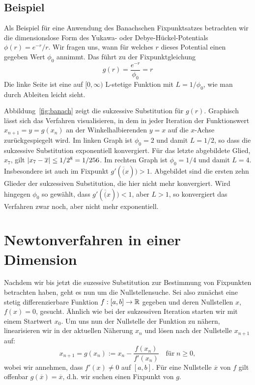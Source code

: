 \subsection{Beispiel}

Als Beispiel für eine Anwendung des Banachschen Fixpunktsatzes
betrachten wir die dimensionslose Form des Yukawa- oder
Debye-Hückel-Potentials $\phi(r) = e^{-r}/r$. Wir fragen uns, wann für
welches $r$ dieses Potential einen gegeben Wert $\phi_0$ annimmt. Das
führt zu der Fixpunktgleichung
\begin{equation}
  g(r) = \frac{e^{-r}}{\phi_0} = r
\end{equation}
Die linke Seite ist eine auf $[0,\infty)$ L-stetige Funktion mit
$L=1/\phi_0$, wie man durch Ableiten leicht sieht.

Abbildung~\ref{fig:banach} zeigt die sukzessive Substitution für
$g(r)$. Graphisch lässt sich das Verfahren visualisieren, in dem in
jeder Iteration der Funktionswert $x_{n+1} = y =g(x_{n})$ an der
Winkelhalbierenden $y=x$ auf die $x$-Achse zurückgespiegelt wird. Im
linken Graph ist $\phi_0=2$ und damit $L=1/2$, so dass die sukzessive
Substitution exponentiell konvergiert. Für das letzte abgebildete
Glied, $x_7$, gilt $\left\lvert{x_7-\overline{x}}\right\rvert \le 1/2^8 = 1/256$. Im
rechten Graph ist $\phi_0=1/4$ und damit $L=4$. Insbesondere ist auch
im Fixpunkt $g'(\overline(x))>1$. Abgebildet sind die ersten zehn
Glieder der sukzessiven Substitution, die hier nicht mehr
konvergiert. Wird hingegen $\phi_0$ so gewählt, dass 
$g'(\overline(x))<1$, aber $L>1$, so konvergiert das Verfahren zwar
noch, aber nicht mehr exponentiell.

\section{Newtonverfahren in einer Dimension}

Nachdem wir bis jetzt die suzessive Substitution zur Bestimmung von
Fixpunkten betrachten haben, geht es nun um die Nullstellensuche. Sei
also zunächst eine stetig differenzierbare Funktion $f:[a,b]\to\mathbb{R}$
gegeben und deren Nullstellen $x$, $f(x) = 0$, gesucht. Ähnlich wie
bei der sukzessiven Iteration starten wir mit einem Startwert
$x_0$. Um uns nun der Nullstelle der Funktion zu nähern, linearisieren
wir in der aktuellen Näherung $x_n$ und lösen nach der Nullstelle
$x_{n+1}$ auf:
\begin{equation}
  x_{n+1} = g(x_n) := x_n - \frac{f(x_n)}{f'(x_n)}\quad\text{für}\; n\ge 0,
\end{equation}
wobei wir annehmen, dass $f'(x)\neq 0$ auf $[a,b]$.  Für eine
Nullstelle $\overline{x}$ von $f$ gilt offenbar $g(\overline{x}) =
\overline{x}$, d.h. wir suchen einen Fixpunkt von $g$.

